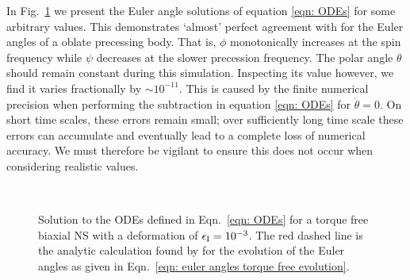\documentclass[../full_thesis/full_thesis.tex]{subfiles}
\begin{document}
In Fig.~\ref{fig: biaxial body no torque} we present the Euler angle solutions
of equation \eqref{eqn: ODEs} for some arbitrary values.
This demonstrates `almost'
perfect agreement with \citet{Jones2001} for the Euler angles of a oblate
precessing body. That is, $\phi$ monotonically increases at the spin frequency
while $\psi$ decreases at the slower precession frequency. The polar angle
$\theta$ should remain constant during this simulation. Inspecting its value
however, we find it varies fractionally by $\sim 10^{-11}$.
This is caused by the finite numerical precision when performing the
subtraction in equation \eqref{eqn: ODEs} for $\dot{\theta}=0$. On
short time scales, these errors remain small; over sufficiently long time scale these errors can
accumulate and eventually lead to a complete loss of numerical accuracy. We
must therefore be vigilant to ensure this does not occur when considering
realistic values.
\begin{figure}[htb]
    \centering
{} \\
\caption{Solution to the ODEs defined in Eqn.~\eqref{eqn: ODEs} for a
torque free biaxial NS with a deformation of $\epsilon_{\mathrm{I}} = 10^{-3}$. The red
dashed line is the analytic calculation found by \citet{Jones2001} for the
evolution of the Euler angles as given in Eqn.~\eqref{eqn: euler angles torque free evolution}.}
\label{fig: biaxial body no torque}
\end{figure}
\end{document}
